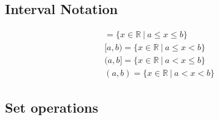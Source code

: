 \documentclass{article}
\theoremstyle{mytheoremstyle}
\theoremstyle{mytheoremstyle}
\theoremstyle{myproblemstyle}
\begin{document}
    \subsection*{Interval Notation}
    \begin{align*}
        [a,b] = \{x\in \mathbb{R}\ |\ a \le x \le b\} \\
        [a,b) = \{x\in \mathbb{R}\ |\ a \le x < b\} \\
        (a,b] = \{x\in \mathbb{R}\ |\ a < x \le b\} \\
        (a,b) = \{x\in \mathbb{R}\ |\ a < x < b\}
    \end{align*}

    \subsection*{Set operations}
\end{document}
